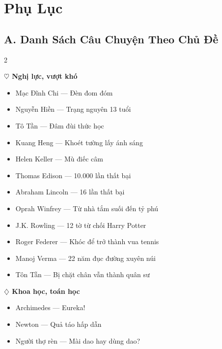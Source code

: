 \chapter*{Phụ Lục}

\section*{A. Danh Sách Câu Chuyện Theo Chủ Đề}

\begin{multicols}{2}

\textbf{\color{truyengreen}$\heartsuit$ Nghị lực, vượt khó}
\begin{itemize}[noitemsep, leftmargin=1.2cm]
  \item Mạc Đĩnh Chi --- Đèn đom đóm
  \item Nguyễn Hiền --- Trạng nguyên 13 tuổi
  \item Tô Tần --- Đâm đùi thức học
  \item Kuang Heng --- Khoét tường lấy ánh sáng
  \item Helen Keller --- Mù điếc câm
  \item Thomas Edison --- 10.000 lần thất bại
  \item Abraham Lincoln --- 16 lần thất bại
  \item Oprah Winfrey --- Từ nhà tắm suối đến tỷ phú
  \item J.K. Rowling --- 12 tờ từ chối Harry Potter
  \item Roger Federer --- Khóc để trở thành vua tennis
  \item Manoj Verma --- 22 năm đục đường xuyên núi
  \item Tôn Tẫn --- Bị chặt chân vẫn thành quân sư
\end{itemize}

\vspace{0.4cm}

\textbf{\color{truyenblue}$\diamondsuit$ Khoa học, toán học}
\begin{itemize}[noitemsep, leftmargin=1.2cm]
  \item Archimedes --- Eureka!
  \item Newton --- Quả táo hấp dẫn
  \item Người thợ rèn --- Mài dao hay dùng dao?
\end{itemize}


\end{multicols}
